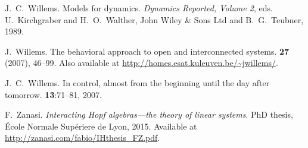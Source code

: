 \begin{thebibliography}{RSW00}
    J.\ C.\ Willems.
    \newblock Models for dynamics.
    \newblock \emph{Dynamics Reported,
    Volume 2}, eds. U.\ Kirchgraber and H.\ O.\ Walther, John Wiley \& Sons
    Ltd and B.\ G.\ Teubner, 1989.

    J.\ Willems.
    \newblock The behavioral approach to open and interconnected
    systems.
     {\bf 27} (2007), 46--99.
    \newblock Also available at
    \href{http://homes.esat.kuleuven.be/~jwillems/}  
    {http://homes.esat.kuleuven.be/\~{}jwillems/}.

    J.\ C.\ Willems.
    \newblock In control, almost from the beginning until the day
    after tomorrow.
     {\bf 13}:71--81, 2007. 

     F.\ Zanasi. 
    \newblock \emph{Interacting Hopf algebras---the theory of linear
    systems}. 
    \newblock PhD thesis, \'Ecole Normale Sup\'eriere de Lyon, 2015. 
    \newblock Available
    at \href{http://zanasi.com/fabio/IHthesis_FZ.pdf}
    {http://zanasi.com/fabio/IHthesis\_FZ.pdf}.

\end{thebibliography}


